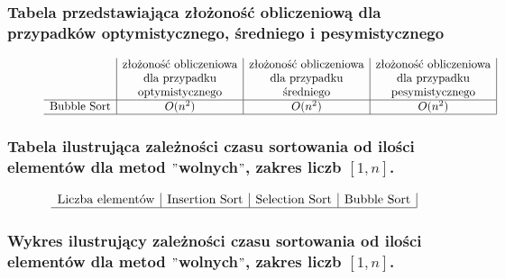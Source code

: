 \documentclass[polish,polish,a4paper]{article}
\begin{document}
\begin{spacing}{1.5}
	
	\subsubsection*{Tabela przedstawiająca złożoność obliczeniową dla przypadków optymistycznego, średniego i pesymistycznego} 
	
	\begin{figure}[H]
			\begin{equation*}
		\begin{array}{l|c|c|c|}

		&$złożoność obliczeniowa$&$złożoność obliczeniowa$&$złożoność obliczeniowa$\\
		&$dla przypadku$&$dla przypadku$&$dla przypadku$\\
		&$optymistycznego$&$średniego$&$pesymistycznego$\\
		\hline
		$Bubble Sort$&O(n^2)&O(n^2)&O(n^2)\\
		\hline
		\end{array}
		\end{equation*}
	\end{figure}

	\subsubsection*{Tabela ilustrująca zależności czasu sortowania od ilości elementów dla metod $"$wolnych$"$, zakres liczb $ [1,n] $.}
	
	\begin{figure}[H]
			\begin{equation*}
		\begin{array}{l|c|c|c|}

		$Liczba elementów$&$Insertion Sort$&$Selection Sort$&$Bubble Sort$\\
		\hline
		\end{array}
		\end{equation*}
	\end{figure}
	
	\subsubsection*{Wykres ilustrujący zależności czasu sortowania od ilości elementów dla metod $"$wolnych$"$, zakres liczb $ [1,n] $.}
	

\end{spacing}
\end{document}
